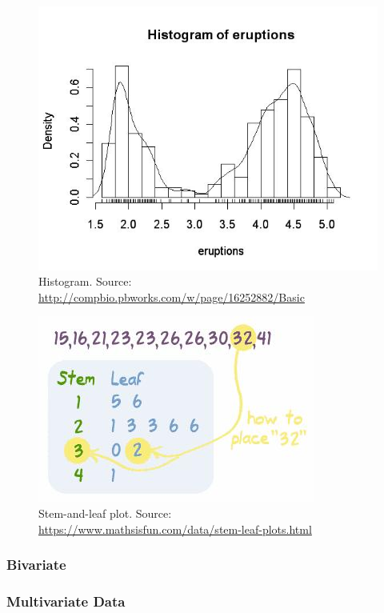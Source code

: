 \documentclass[12pt,a4paper]{report}
\begin{document}
\begin{figure}
\centering
\includegraphics[width=0.7\linewidth]{art/histogram_eruptions}
\caption[Histogram]{Histogram. Source: \url{http://compbio.pbworks.com/w/page/16252882/Basic}}
\label{fig:histogram_eruptions}
\end{figure}

\begin{figure}
\centering
\includegraphics[width=0.7\linewidth]{art/stem_and_leaf}
\caption[Stem and Leaf Pot]{Stem-and-leaf plot. Source: \url{https://www.mathsisfun.com/data/stem-leaf-plots.html}}
\label{fig:stem_and_leaf}
\end{figure}




\subsubsection{Bivariate}

\subsubsection{Multivariate Data}
\end{document}

